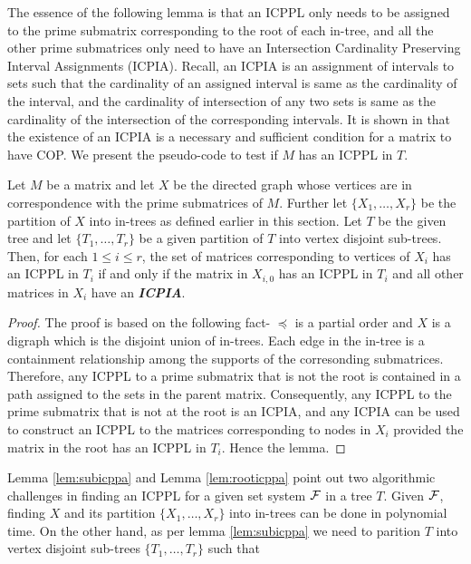 The essence of the following lemma is that an ICPPL only needs to be
assigned to the prime submatrix corresponding to the root of each
in-tree, and all the other prime submatrices only need to have an
Intersection Cardinality Preserving Interval Assignments (ICPIA).
Recall, an ICPIA is an assignment of intervals to sets such that the
cardinality of an assigned interval is same as the cardinality of the
interval, and the cardinality of intersection of any two sets is same
as the cardinality of the intersection of the corresponding intervals.
It is shown in \cite{nsnrs09} that the existence of an ICPIA is a
necessary and sufficient condition for a matrix to have COP.  We
present the pseudo-code to test if $M$ has an ICPPL in $T$.
\begin{lemma} \label{lem:rooticppa} Let $M$ be a matrix and let $X$ be
  the directed graph whose vertices are in correspondence with the
  prime submatrices of $M$.  Further let $\{X_1,\ldots,X_r\}$ be the
  partition of $X$ into in-trees as defined earlier in this section.
  Let $T$ be the given tree and let $\{T_1, \ldots, T_r\}$ be a given
  partition of $T$ into vertex disjoint sub-trees.  Then, for each $1
  \leq i \leq r$, the set of matrices corresponding to vertices of
  $X_i$ has an ICPPL in $T_i$ if and only if the matrix in $X_{i,0}$
  has an ICPPL in $T_i$ and all other matrices in $X_i$ have an {\bf
    {\em ICPIA}}.
\end{lemma}
\begin{proof}\thesisspacing
  The proof is based on the following fact- $\preccurlyeq$ is a
  partial order and $X$ is a digraph which is the disjoint union of
  in-trees.  Each edge in the in-tree is a containment relationship
  among the supports of the corresonding submatrices. Therefore, any
  ICPPL to a prime submatrix that is not the root is contained in a
  path assigned to the sets in the parent matrix.  Consequently, any
  ICPPL to the prime submatrix that is not at the root is an ICPIA,
  and any ICPIA can be used to construct an ICPPL to the matrices
  corresponding to nodes in $X_i$ provided the matrix in the root has
  an ICPPL in $T_i$.  Hence the lemma.
\end{proof}
Lemma \ref{lem:subicppa} and Lemma \ref{lem:rooticppa} point out two
algorithmic challenges in finding an ICPPL for a given set system
${\cal F}$ in a tree $T$.  Given ${\cal F}$, finding $X$ and its partition
$\{X_1,\ldots,X_r\}$ into in-trees can be done in polynomial time.  On
the other hand, as per lemma \ref{lem:subicppa} we need to parition
$T$ into vertex disjoint sub-trees $\{T_1, \ldots, T_r\}$ such that
